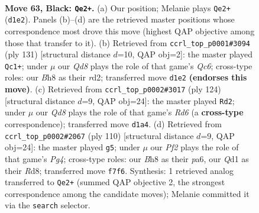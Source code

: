 \documentclass[11pt]{article}
\begin{document}
\clearpage

\begin{figure}[p]\centering
\begin{subfigure}{0.46\textwidth}\centering
\resizebox{\linewidth}{!}{%
\newchessgame
\chessboard[
  setfen={5k1b/5p2/8/1R1P4/8/8/6K1/3q4 b - - 4 63},
  showmover=false,
  pgfstyle=straightmove, color=movearrow, markmove={d1-e2}
]}
\caption{}
\end{subfigure}\hfill
\begin{subfigure}{0.46\textwidth}\centering
\resizebox{\linewidth}{!}{%
\newchessgame
\chessboard[
  setfen={8/4PR2/6pk/8/8/2q5/3R4/4K3 b - - 10 66},
  showmover=false,
  pgfstyle=straightmove, color=movearrow, markmove={c3-c1}
]}
\caption{}
\end{subfigure}
\\[4pt]
\begin{subfigure}{0.46\textwidth}\centering
\resizebox{\linewidth}{!}{%
\newchessgame
\chessboard[
  setfen={8/8/3R3p/8/2k2KP1/7r/8/8 w - - 4 63},
  showmover=false,
  pgfstyle=straightmove, color=movearrow, markmove={d6-d2}
]}
\caption{}
\end{subfigure}\hfill
\begin{subfigure}{0.46\textwidth}\centering
\resizebox{\linewidth}{!}{%
\newchessgame
\chessboard[
  setfen={3R4/8/p3k3/8/2rp1KP1/8/8/8 w - - 1 56},
  showmover=false,
  pgfstyle=straightmove, color=movearrow, markmove={g4-g5}
]}
\caption{}
\end{subfigure}
\caption{\textbf{Move 63, Black: \texttt{Qe2+}.} (a) Our position; Melanie plays \texttt{Qe2+} (\texttt{d1e2}). Panels (b)--(d) are the retrieved master positions whose correspondence most drove this move (highest QAP objective among those that transfer to it). (b) Retrieved from \texttt{ccrl\_top\_p0001\#3094} (ply 131) [structural distance $d$=10, QAP obj=2]: the master played \texttt{Qc1+}; under $\mu$ our \emph{Qd8} plays the role of that game's \emph{Qc6}; cross-type roles: our \emph{B}h8 as their \emph{r}d2; transferred move \texttt{d1e2} \textbf{(endorses this move)}. (c) Retrieved from \texttt{ccrl\_top\_p0002\#3017} (ply 124) [structural distance $d$=9, QAP obj=24]: the master played \texttt{Rd2}; under $\mu$ our \emph{Qd8} plays the role of that game's \emph{Rd6} (a \textbf{cross-type} correspondence); transferred move \texttt{d1a4}. (d) Retrieved from \texttt{ccrl\_top\_p0002\#2067} (ply 110) [structural distance $d$=9, QAP obj=24]: the master played \texttt{g5}; under $\mu$ our \emph{Pf2} plays the role of that game's \emph{Pg4}; cross-type roles: our \emph{B}h8 as their \emph{p}a6, our \emph{Q}d1 as their \emph{R}d8; transferred move \texttt{f7f6}. Synthesis: 1 retrieved analog transferred to \texttt{Qe2+} (summed QAP objective 2, the strongest correspondence among the candidate moves); Melanie committed it via the \texttt{search} selector.}
\label{fig:thought-m125}
\end{figure}
\end{document}

